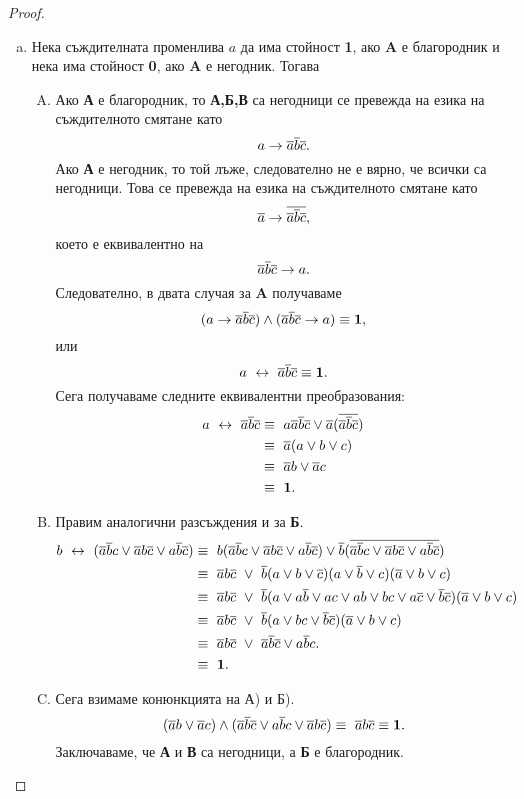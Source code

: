 \begin{proof}
  \begin{enumerate}[a)]
  \item
    Нека съждителната променлива $a$ да има стойност {\bf 1}, ако {\bf A} е благородник и нека има стойност {\bf 0}, 
    ако {\bf A} е негодник.
    Тогава
    \begin{enumerate}[A)]
    \item
      Ако {\bf А} е благородник, то {\bf А,Б,В} са негодници се превежда на езика на съждителното смятане като
      \[a \rightarrow \overline{a}\overline{b}\overline{c}.\]
      Ако {\bf А} е негодник, то той лъже, следователно не е вярно, че всички са негодници. Това се превежда на езика на съждителното смятане като
      \[\overline{a} \rightarrow \overline{\overline{a}\overline{b}\overline{c}},\] 
      което е еквивалентно на \[\overline{a}\overline{b}\overline{c}\rightarrow a.\]
      Следователно, в двата случая за {\bf A} получаваме
      \[(a \rightarrow \overline{a}\overline{b}\overline{c}) \wedge (\overline{a}\overline{b}\overline{c}\rightarrow a) \equiv \mathbf{1},\]
      или
      \[a \ \leftrightarrow\  \overline{a}\overline{b}\overline{c} \equiv \mathbf{1}.\]
      Сега получаваме следните еквивалентни преобразования:
      \begin{align*}
        a \ \leftrightarrow\  \overline{a}\overline{b}\overline{c} & \equiv\ a\overline{a}\overline{b}\overline{c} \vee \overline{a}(\overline{\overline{a}\overline{b}\overline{c}})\\
        & \equiv\ \overline{a}(a \vee b \vee c)\\
        & \equiv\ \overline{a}b \vee \overline{a}c\\
        & \equiv\ \mathbf{1}.
      \end{align*}
    \item
      Правим аналогични разсъждения и за {\bf Б}.
      \begin{align*}
        b \ \leftrightarrow\  (\overline{a}\overline{b}c\vee \overline{a}b\overline{c}\vee a\overline{b}\overline{c}) & \equiv\ b(\overline{a}\overline{b}c\vee \overline{a}b\overline{c}\vee a\overline{b}\overline{c})\vee \overline{b}(\overline{\overline{a}\overline{b}c\vee \overline{a}b\overline{c}\vee a\overline{b}\overline{c}})\\
        & \equiv\ \overline{a}b\overline{c}\ \vee\ \overline{b}(a\vee b \vee \overline{c})(a\vee\overline{b}\vee c)(\overline{a} \vee b \vee c)\\
        & \equiv\ \overline{a}b\overline{c}\ \vee\ \overline{b}(a \vee a\overline{b} \vee ac \vee ab \vee bc \vee a\overline{c} \vee \overline{b}\overline{c})(\overline{a} \vee b \vee c)\\
        & \equiv\ \overline{a}b\overline{c}\ \vee\ \overline{b}(a \vee bc \vee \overline{b}\overline{c})(\overline{a} \vee b \vee c)\\
        & \equiv\ \overline{a}b\overline{c}\ \vee\ \overline{a}\overline{b}\overline{c} \vee  a\overline{b}c.\\
        & \equiv\ \mathbf{1}. 
      \end{align*}
    \item
      Сега взимаме конюнкцията на А) и Б).
      \[(\overline{a}b \vee \overline{a}c)\wedge (\overline{a}\overline{b}\overline{c} \vee  a\overline{b}c \vee \overline{a}b\overline{c}) \equiv\ \overline{a}b\overline{c} \equiv {\mathbf 1}.\]
      Заключаваме, че {\bf А} и {\bf В} са негодници, а {\bf Б} е благородник.
    \end{enumerate}
  \end{enumerate}
\end{proof}

